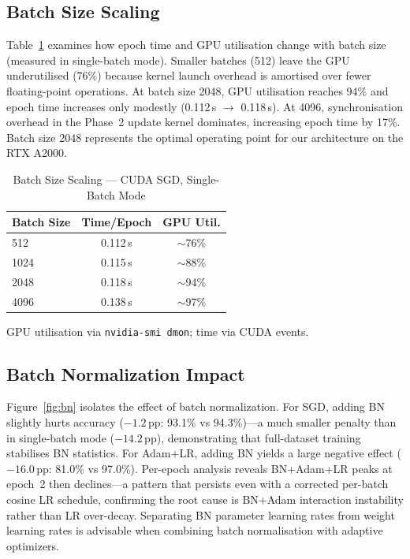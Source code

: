 \documentclass[runningheads]{llncs}
\begin{document}
\subsection{Batch Size Scaling}

Table~\ref{tab:batchsize} examines how epoch time and GPU utilisation
change with batch size (measured in single-batch mode). Smaller batches
(512) leave the GPU underutilised (76\%) because kernel launch overhead is
amortised over fewer floating-point operations. At batch size 2048, GPU
utilisation reaches 94\% and epoch time increases only modestly
(0.112\,s $\to$ 0.118\,s). At 4096, synchronisation overhead in the
Phase~2 update kernel dominates, increasing epoch time by 17\%. Batch
size 2048 represents the optimal operating point for our architecture on
the RTX A2000.

\begin{table}[htb]
\caption{Batch Size Scaling — CUDA SGD, Single-Batch Mode}
\label{tab:batchsize}
\centering
\begin{tabular}{lcc}
\toprule
\textbf{Batch Size} & \textbf{Time/Epoch} & \textbf{GPU Util.}\\
\midrule
512  & 0.112\,s & $\sim$76\% \\
1024 & 0.115\,s & $\sim$88\% \\
2048 & 0.118\,s & $\sim$94\% \\
4096 & 0.138\,s & $\sim$97\% \\
\bottomrule
\end{tabular}

\smallskip
{\footnotesize GPU utilisation via \texttt{nvidia-smi dmon};
time via CUDA events.}
\end{table}

\subsection{Batch Normalization Impact}
\label{sec:bn}

Figure~\ref{fig:bn} isolates the effect of batch normalization. For SGD,
adding BN slightly hurts accuracy ($-1.2$\,pp: 93.1\% vs 94.3\%)—a much
smaller penalty than in single-batch mode ($-14.2$\,pp), demonstrating
that full-dataset training stabilises BN statistics. For Adam+LR, adding
BN yields a large negative effect ($-16.0$\,pp: 81.0\% vs 97.0\%).
Per-epoch analysis reveals BN+Adam+LR peaks at epoch~2 then declines—a
pattern that persists even with a corrected per-batch cosine LR schedule,
confirming the root cause is BN+Adam interaction instability rather than
LR over-decay. Separating BN parameter learning rates from weight learning
rates is advisable when combining batch normalisation with adaptive
optimizers.
\end{document}
